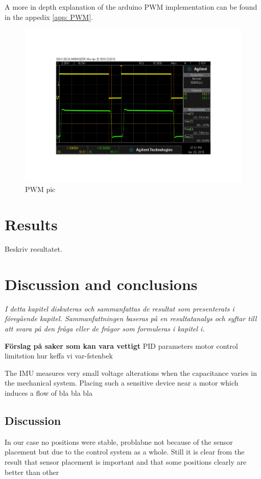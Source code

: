 \documentclass[a4paper,11pt]{kth-mag}
\begin{document}
A more in depth explanation of the arduino PWM implementation can be found in the appedix \ref{app: PWM}.
\begin{figure}[!Hbt]
\centering
\includegraphics[trim=1cm 3cm 1cm 3cm, clip=true,scale=0.5]{PWMpic.pdf}
\caption{PWM pic}
\label{Fig: PWMscope}
\end{figure} 


\chapter{Results}
Beskriv resultatet. 

\chapter{Discussion and conclusions}
\emph{I detta kapitel diskuteras och sammanfattas de resultat som presenterats i föregående kapitel. Sammanfattningen baseras på en resultatanalys och syftar till att svara på den fråga eller de frågor som formuleras i kapitel i.}

\textbf{Förslag på saker som kan vara vettigt}
PID parameters
motor control limitstion
hur keffa vi var-fstenbek

The IMU measures very small voltage alterations when the capacitance varies in the mechanical system. Placing such a sensitive device near a motor which induces a flow of bla bla bla

\section{Discussion}
In our case no positions were stable, problabne not because of the sensor placement but due to the control system as a whole. Still it is clear from the result that sensor placement is important and that some positions clearly are better than other
\end{document}
